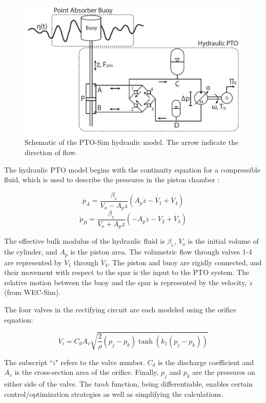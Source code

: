\documentclass[twocolumn,10pt]{asme2e}
\begin{document}
\begin{figure}[t]
    \centering
    \includegraphics[width=1\columnwidth]{Images/HydraulicPTO}
    \caption{Schematic of the PTO-Sim hydraulic model. The arrow indicate the direction of flow.}
    \label{HydPTO}
    \end{figure}

The hydraulic PTO model begins with the continuity equation for a compressible fluid, which is used to describe the pressures in the piston chamber \cite{merritthydraulic}:

\begin{equation}
\dot{p}_A=\frac{\beta_e}{V_o-A_pz}(A_p\dot{z}-\dot{V_1}+\dot{V_4}) 
\end{equation}
\begin{equation}
\dot{p}_B=\frac{\beta_e}{V_o+A_pz}(-A_p\dot{z}-\dot{V_2}+\dot{V_3}) 
\end{equation}

The effective bulk modulus of the hydraulic fluid is $\beta_e$, $V_o$ is the initial volume of the cylinder, and $A_p$ is the piston area. The volumetric flow through valves 1-4 are represented by $\dot{V}_1$ through $\dot{V}_4$. The piston and buoy are rigidly connected, and their movement with respect to the spar is the input to the PTO system. The relative motion between the buoy and the spar is represented by the velocity, $\dot{z}$ (from WEC-Sim).

The four valves in the rectifying circuit are each modeled using the orifice equation: 

\begin{equation}
\dot{V}_i=C_dA_v \sqrt{\frac{2}{\rho}(p_j-p_k)\tanh(k_1(p_j-p_k))}  
\end{equation}

The subscript ``$i$" refers to the valve number. $C_d$ is the discharge coefficient and $A_v$ is the cross-section area of the orifice. Finally, $p_j$ and $p_k$ are the pressures on either side of the valve. The $tanh$ function, being differentiable, enables certain  control/optimization strategies as well as simplifying
the calculations. 
\end{document}

